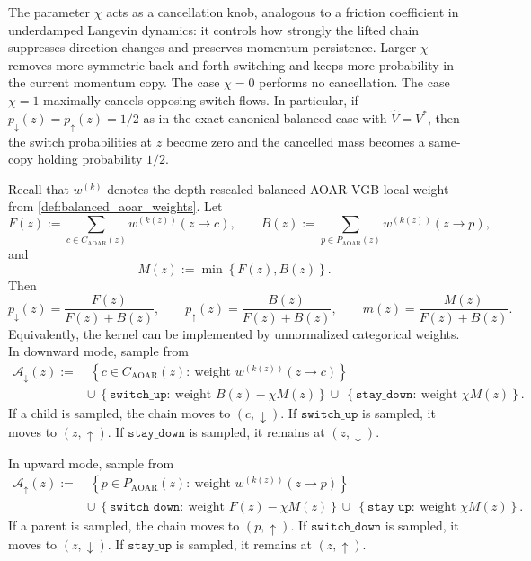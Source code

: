 \documentclass{article}
\numberwithin{theorem}{section}
\numberwithin{proposition}{section}
\numberwithin{corollary}{section}
\numberwithin{lemma}{section}
\numberwithin{conjecture}{section}
\numberwithin{remark}{section}
\numberwithin{definition}{section}
\numberwithin{assumption}{section}
\numberwithin{example}{section}
\newcommand{\calA}{{\mathcal{A}}}
\newcommand{\mbra}[1]{\left\{#1\right\}}
\begin{document}
The parameter $\chi$ acts as a cancellation knob, analogous to a friction coefficient in underdamped Langevin dynamics: it controls how strongly the lifted chain suppresses direction changes and preserves momentum persistence. Larger $\chi$ removes more symmetric back-and-forth switching and keeps more probability in the current momentum copy. The case $\chi=0$ performs no cancellation. The case $\chi=1$ maximally cancels opposing switch flows. In particular, if $p_{\downarrow}(z)=p_{\uparrow}(z)=1/2$ as in the exact canonical balanced case with $\widehat V=V^*$, then the switch probabilities at $z$ become zero and the cancelled mass becomes a same-copy holding probability $1/2$.

\begin{remark}
\label{rem:flow_cancelled_categorical_implementation}
Recall that $w^{(k)}$ denotes the depth-rescaled balanced AOAR-VGB local weight from \cref{def:balanced_aoar_weights}. Let
\begin{equation*}
    F(z):=\sum_{c\in C_{\mathrm{AOAR}}(z)}w^{(k(z))}(z\to c), \qquad
    B(z):=\sum_{p\in P_{\mathrm{AOAR}}(z)}w^{(k(z))}(z\to p),
\end{equation*}
and
\begin{equation*}
    M(z):=\min\mbra{F(z),B(z)}.
\end{equation*}
Then
\begin{equation*}
    p_{\downarrow}(z)=\frac{F(z)}{F(z)+B(z)}, \qquad
    p_{\uparrow}(z)=\frac{B(z)}{F(z)+B(z)}, \qquad
    m(z)=\frac{M(z)}{F(z)+B(z)}.
\end{equation*}
Equivalently, the kernel can be implemented by unnormalized categorical weights. In downward mode, sample from
\begin{align*}
    \calA_{\downarrow}(z)
    :=
    &\ \mbra{c\in C_{\mathrm{AOAR}}(z):\ \text{weight }w^{(k(z))}(z\to c)}\\
    &\cup\ \mbra{\texttt{switch\_up}:\ \text{weight }B(z)-\chi M(z)}
     \cup\ \mbra{\texttt{stay\_down}:\ \text{weight }\chi M(z)}.
\end{align*}
If a child is sampled, the chain moves to $(c,\downarrow)$. If $\texttt{switch\_up}$ is sampled, it moves to $(z,\uparrow)$. If $\texttt{stay\_down}$ is sampled, it remains at $(z,\downarrow)$.

In upward mode, sample from
\begin{align*}
    \calA_{\uparrow}(z)
    :=
    &\ \mbra{p\in P_{\mathrm{AOAR}}(z):\ \text{weight }w^{(k(z))}(z\to p)}\\
    &\cup\ \mbra{\texttt{switch\_down}:\ \text{weight }F(z)-\chi M(z)}
     \cup\ \mbra{\texttt{stay\_up}:\ \text{weight }\chi M(z)}.
\end{align*}
If a parent is sampled, the chain moves to $(p,\uparrow)$. If $\texttt{switch\_down}$ is sampled, it moves to $(z,\downarrow)$. If $\texttt{stay\_up}$ is sampled, it remains at $(z,\uparrow)$.
\end{remark}
\end{document}
